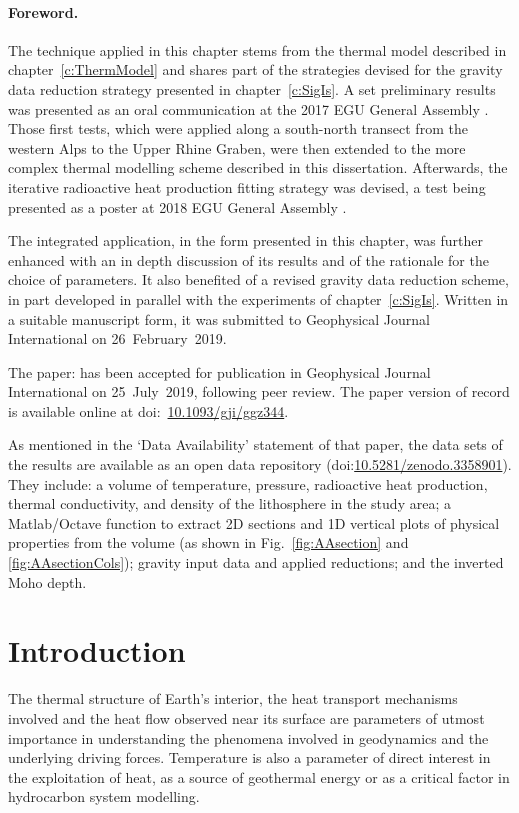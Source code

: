 \paragraph*{Foreword.}
The technique applied in this chapter stems from the thermal model described in chapter~\ref{c:ThermModel} and shares part of the strategies devised for the gravity data reduction strategy presented in chapter~\ref{c:SigIs}.
A set preliminary results was presented as an oral communication at the 2017 EGU General Assembly \parencite{Pastorutti2017_EGUoral}.
Those first tests, which were applied along a south-north transect from the western Alps to the Upper Rhine Graben, were then extended to the more complex thermal modelling scheme described in this dissertation.
Afterwards, the iterative radioactive heat production fitting strategy was devised, a test being presented as a poster at 2018 EGU General Assembly \parencite{Pastorutti2018_EGUposter}.

The integrated application, in the form presented in this chapter, was further enhanced with an in depth discussion of its results and of the rationale for the choice of parameters.
It also benefited of a revised gravity data reduction scheme, in part developed in parallel with the experiments of chapter~\ref{c:SigIs}.
Written in a suitable manuscript form, it was submitted to Geophysical Journal International on 26~February~2019.

The paper:  \parencite{Pastorutti2019} has been accepted for publication in Geophysical Journal International on 25~July~2019, following peer review.
The paper version of record is available online at doi:~\href{https://doi.org/10.1093/gji/ggz344}{10.1093/gji/ggz344}.

As mentioned in the `Data Availability' statement of that paper, the data sets of the results are available as an open data repository (doi:\href{https://doi.org/10.5281/zenodo.3358901}{10.5281/zenodo.3358901}).
They include: a volume of temperature, pressure, radioactive heat production, thermal conductivity, and density of the lithosphere in the study area; a Matlab/Octave function to extract 2D sections and 1D vertical plots of physical properties from the volume (as shown in Fig.~\ref{fig:AAsection} and \ref{fig:AAsectionCols}); gravity input data and applied reductions; and the inverted Moho depth.

\section{Introduction}
\label{s:Appl:Intro}
The thermal structure of Earth's interior, the heat transport mechanisms involved and the heat flow observed near its surface are parameters of utmost importance in understanding the phenomena involved in geodynamics and the underlying driving forces.
Temperature is also a parameter of direct interest in the exploitation of heat, as a source of geothermal energy or as a critical factor in hydrocarbon system modelling.

